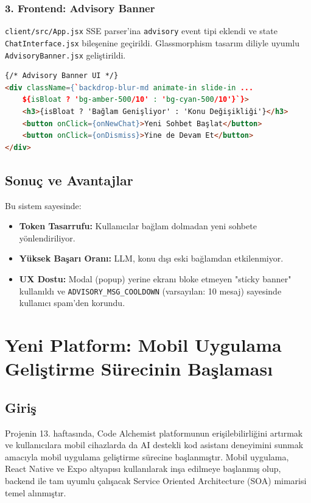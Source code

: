 \documentclass[12pt,a4paper]{report}
\begin{document}
\subsection{3. Frontend: Advisory Banner}

\texttt{client/src/App.jsx} SSE parser'ina \texttt{advisory} event tipi eklendi ve state \texttt{ChatInterface.jsx} bileşenine geçirildi. Glassmorphism tasarım diliyle uyumlu \texttt{AdvisoryBanner.jsx} geliştirildi.

\begin{lstlisting}[language=HTML]
{/* Advisory Banner UI */}
<div className={`backdrop-blur-md animate-in slide-in ... 
    ${isBloat ? 'bg-amber-500/10' : 'bg-cyan-500/10'}`}>
    <h3>{isBloat ? 'Bağlam Genişliyor' : 'Konu Değişikliği'}</h3>
    <button onClick={onNewChat}>Yeni Sohbet Başlat</button>
    <button onClick={onDismiss}>Yine de Devam Et</button>
</div>
\end{lstlisting}

\section{Sonuç ve Avantajlar}

Bu sistem sayesinde:
\begin{itemize}
    \item \textbf{Token Tasarrufu:} Kullanıcılar bağlam dolmadan yeni sohbete yönlendiriliyor.
    \item \textbf{Yüksek Başarı Oranı:} LLM, konu dışı eski bağlamdan etkilenmiyor.
    \item \textbf{UX Dostu:} Modal (popup) yerine ekranı bloke etmeyen "sticky banner" kullanıldı ve \texttt{ADVISORY\_MSG\_COOLDOWN} (varsayılan: 10 mesaj) sayesinde kullanıcı spam'den korundu.
\end{itemize}

\chapter{Yeni Platform: Mobil Uygulama Geliştirme Sürecinin Başlaması}

\section{Giriş}

Projenin 13. haftasında, Code Alchemist platformunun erişilebilirliğini artırmak ve kullanıcılara mobil cihazlarda da AI destekli kod asistanı deneyimini sunmak amacıyla mobil uygulama geliştirme sürecine başlanmıştır. Mobil uygulama, React Native ve Expo altyapısı kullanılarak inşa edilmeye başlanmış olup, backend ile tam uyumlu çalışacak Service Oriented Architecture (SOA) mimarisi temel alınmıştır.
\end{document}
